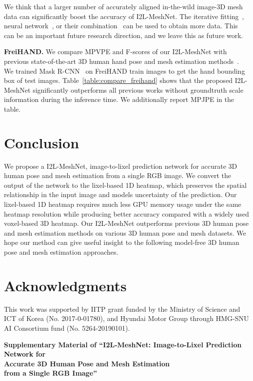 \documentclass[runningheads]{llncs}
\begin{document}
We think that a larger number of accurately aligned in-the-wild image-3D mesh data can significantly boost the accuracy of I2L-MeshNet.
The iterative fitting~\cite{bogo2016keep,pavlakos2019expressive}, neural network~\cite{joo2020exemplar}, or their combination~\cite{kolotouros2019learning} can be used to obtain more data.
This can be an important future research direction, and we leave this as future work.


\noindent \textbf{FreiHAND.}
We compare MPVPE and F-scores of our I2L-MeshNet with previous state-of-the-art 3D human hand pose and mesh estimation methods~\cite{boukhayma20193d,hasson2019learning,Freihand2019}.
We trained Mask R-CNN~\cite{he2017mask} on FreiHAND train images to get the hand bounding box of test images.
Table~\ref{table:compare_freihand} shows that the proposed I2L-MeshNet significantly outperforms all previous works without groundtruth scale information during the inference time.
We additionally report MPJPE in the table.

 \section{Conclusion}

We propose a I2L-MeshNet, image-to-lixel prediction network for accurate 3D human pose and mesh estimation from a single RGB image.
We convert the output of the network to the lixel-based 1D heatmap, which preserves the spatial relationship in the input image and models uncertainty of the prediction.
Our lixel-based 1D heatmap requires much less GPU memory usage under the same heatmap resolution while producing better accuracy compared with a widely used voxel-based 3D heatmap.
Our I2L-MeshNet outperforms previous 3D human pose and mesh estimation methods on various 3D human pose and mesh datasets.
We hope our method can give useful insight to the following model-free 3D human pose and mesh estimation approaches.
 
\section*{Acknowledgments}
This work was supported by IITP grant funded by the Ministry of Science and ICT of Korea (No. 2017-0-01780), and Hyundai Motor Group through HMG-SNU AI Consortium fund (No. 5264-20190101).

\clearpage

\begin{center}
\textbf{\large Supplementary Material of \enquote{I2L-MeshNet: Image-to-Lixel Prediction Network for \\ Accurate 3D Human Pose and Mesh Estimation \\ from a Single RGB Image}}
\end{center}
\end{document}
